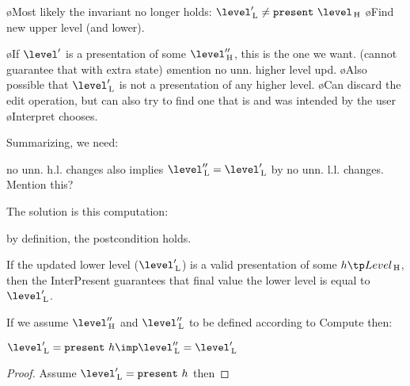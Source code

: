 \bl
\o Most likely the invariant no longer holds: $\level'\L \neq \present~\level\H$
\o Find new upper level (and lower).
\el

\bl 
\o If  $\level'$ is a presentation of some $\level''\H$, this is the one we want. (cannot guarantee that with extra state)
\o mention no unn. higher level upd.
\o Also possible that $\level'\L$ is not a presentation of any higher level. 
\o Can discard the edit operation, but can also try to find one that is and was intended by the user
\o Interpret chooses.
\el

Summarizing, we need:



no unn. h.l. changes also implies $\level''\L = \level'\L$ by no unn. l.l. changes. Mention this?

The solution is this computation: 



by definition, the postcondition holds.


If the updated lower level ($\level'\L$) is a valid presentation of some $h \tp Level\H$, then the {\sc InterPresent} guarantees that final value the lower level is equal to $\level'\L$.

If we assume $\level''\H$ and $\level''\L$ to be defined according to {\sc Compute} then:

$\level'\L = \present~h \imp \level''\L = \level'\L$

\begin{proof} Assume $\level'\L = \present~h$ then
\end{proof}

